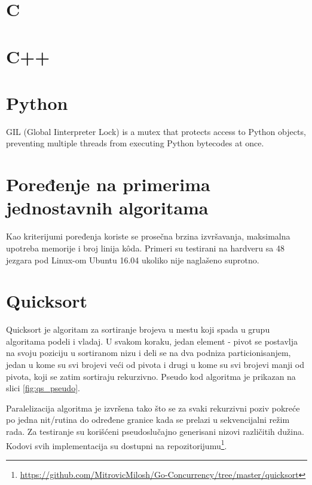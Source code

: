 \documentclass[12pt,oneside]{memoir}
\begin{document}
\section{C}

\section{C++}

\section{Python}
\label{gil} GIL (Global Iinterpreter Lock) is a mutex that protects access to Python objects, preventing multiple threads from executing Python bytecodes at once.

\section{Poređenje na primerima jednostavnih algoritama}
Kao kriterijumi poređenja koriste se prosečna brzina izvršavanja, maksimalna upotreba memorije i broj linija k\^{o}da. Primeri su testirani na hardveru sa 48 jezgara pod Linux-om Ubuntu 16.04 ukoliko nije naglašeno suprotno. 



\section{Quicksort}
Quicksort je algoritam za sortiranje brojeva u mestu koji spada u grupu algoritama podeli i vladaj. U svakom koraku, jedan element - pivot se postavlja na svoju poziciju u sortiranom nizu i deli se na dva podniza particionisanjem, jedan u kome su svi brojevi veći od pivota i drugi u kome su svi brojevi manji od pivota, koji se zatim sortiraju rekurzivno.  Pseudo kod algoritma je prikazan na slici \ref{fig:qs_pseudo}. 

Paralelizacija algoritma je izvršena tako što se za svaki rekurzivni poziv pokreće po jedna nit/rutina do određene granice kada se prelazi u sekvencijalni režim rada. Za testiranje su korišćeni pseudoslučajno generisani nizovi različitih dužina. Kodovi svih implementacija su dostupni na repozitorijumu\footnote{\url{https://github.com/MitrovicMilosh/Go-Concurrency/tree/master/quicksort}}.
\end{document}
